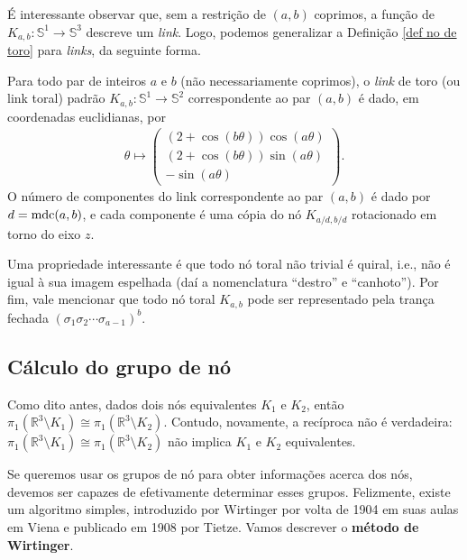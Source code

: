 	É interessante observar que, sem a restrição de $(a,b)$ coprimos, a função de
	$K_{a,b}:\mathbb{S}^1\to\mathbb{S}^3$ descreve um \textit{link}. Logo, 
	podemos generalizar a Definição \ref{def no de toro} para \textit{links}, da seguinte forma.
	\begin{definition}
	\label{def link de toro}
		Para todo par de inteiros $a$ e $b$ (não necessariamente coprimos), o 
		\textit{link} de toro (ou link toral) padrão $K_{a,b}: \mathbb{S}^1\to\mathbb{S}^2$ 
		correspondente ao par $(a,b)$ é dado, em coordenadas euclidianas, por
		\begin{align*}
    		\theta\mapsto
    		\left( 
    		\begin{matrix}
    		(2+\cos(b\theta))\cos(a\theta) \\
    		(2+\cos(b\theta))\sin(a\theta) \\
    		-\sin(a\theta)
    		\end{matrix} 
    		\right).
		\end{align*}
		O número de componentes do link correspondente ao par $(a,b)$ é dado por $d = \operatorname{mdc}(a,b)$, 
		e cada componente é uma cópia do nó $\displaystyle{K_{a/d, b/d}}$ rotacionado em torno do eixo $z$.
	\end{definition}
	Uma propriedade interessante é que todo nó toral não trivial é quiral, i.e., não é igual 
	à sua imagem espelhada (daí a nomenclatura ``destro'' e ``canhoto''). Por fim, vale 
	mencionar que todo nó toral $K_{a,b}$ pode ser representado pela trança fechada
	$(\sigma_1\sigma_2\cdots\sigma_{a-1})^b$.  
	
	\subsection{Cálculo do grupo de nó}
	Como dito antes, dados dois nós equivalentes $K_1$ e $K_2$, então 
	$\pi_1(\mathbb{R}^3\setminus K_1) \cong \pi_1(\mathbb{R}^3\setminus K_2)$. Contudo, 
	novamente, a recíproca não é verdadeira: 
	$\pi_1(\mathbb{R}^3\setminus K_1) \cong \pi_1(\mathbb{R}^3\setminus K_2)$ não implica 
	$K_1$ e $K_2$ equivalentes.
	
	\par\vspace{0.3cm} Se queremos usar os grupos de nó para obter informações acerca dos nós, 
	devemos ser capazes de efetivamente determinar esses grupos. Felizmente, existe um algoritmo 
	simples, introduzido por Wirtinger por volta de 1904 em suas aulas em Viena e publicado em 
	1908 por Tietze. Vamos descrever o \textbf{método de Wirtinger}.
	
